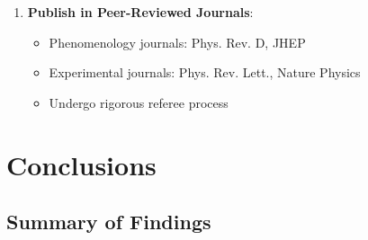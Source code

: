 \begin{enumerate}
    \item \textbf{Publish in Peer-Reviewed Journals}:
    \begin{itemize}
        \item Phenomenology journals: Phys. Rev. D, JHEP
        \item Experimental journals: Phys. Rev. Lett., Nature Physics
        \item Undergo rigorous referee process
    \end{itemize}
\end{enumerate}

\section{Conclusions}

\subsection{Summary of Findings}

